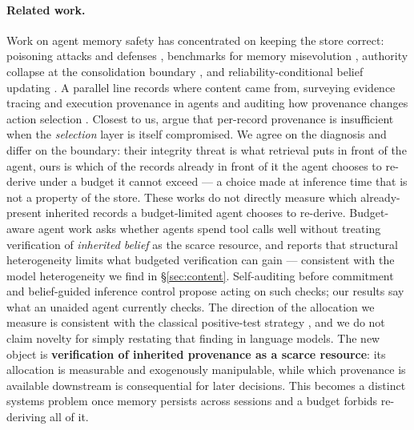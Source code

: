 \paragraph{Related work.} Work on agent memory safety has concentrated on
keeping the store correct: poisoning attacks and defenses
\citep{dash2026untrusted,louck2026securing}, benchmarks for memory misevolution
\citep{xie2026memevobench}, authority collapse at the consolidation boundary
\citep{zhan2026authority}, and reliability-conditional belief updating
\citep{singh2026belief}. A parallel line records where content came from,
surveying evidence tracing and execution provenance in agents
\citep{wang2026traces} and auditing how provenance changes action selection
\citep{liao2026auditing}. Closest to us, \citet{fei2026selection} argue that
per-record provenance is insufficient when the \emph{selection} layer is itself
compromised. We agree on the diagnosis and differ on the boundary: their
integrity threat is what retrieval puts in front of the agent, ours is which of
the records already in front of it the agent chooses to re-derive under a
budget it cannot exceed --- a choice made at inference time that is not a
property of the store. These works do not directly measure which
already-present inherited records a budget-limited agent chooses to re-derive.
Budget-aware agent work asks whether agents spend tool calls well
\citep{lin2026bagen,fang2026budget,wang2026allocbench} without treating
verification of \emph{inherited belief} as the scarce resource, and
\citet{yang2026hetero} reports that structural heterogeneity limits what
budgeted verification can gain --- consistent with the model heterogeneity we
find in \S\ref{sec:content}. Self-auditing before commitment
\citep{yuan2026verify} and belief-guided inference control
\citep{yuan2026belief} propose acting on such checks; our results say what an
unaided agent currently checks. The direction of the allocation we measure is
consistent with the classical positive-test strategy
\citep{wason1960,klayman1987}, and we do not claim novelty for simply restating
that finding in language models. The new object is \textbf{verification of
inherited provenance as a scarce resource}: its allocation is measurable and
exogenously manipulable, while which provenance is available downstream is
consequential for later decisions. This becomes a distinct systems problem once
memory persists across sessions and a budget forbids re-deriving all of it.
